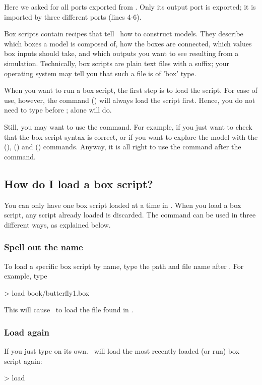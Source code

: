 Here we asked for all ports exported from . Only its  output port is exported; it is imported by three different  ports (lines 4-6).


Box scripts contain recipes that tell \US\ how to construct models. They describe which boxes a model is composed of, how the boxes are connected, which values box inputs should take, and which outputs you want to see resulting from a simulation. Technically, box scripts are plain text files with a  suffix; your operating system may tell you that such a file is of 'box' type. 

When you want to run a box script, the first step is to load the script. For ease of use, however, the  command () will always load the script first. Hence, you do not need to type  before ;  alone will do.

Still, you may want to use the  command. For example, if you just want to check that the box script syntax is correct, or if you want to explore the model with the  (),  () and  () commands. Anyway, it is all right to use the  command after the  command.

\subsection{How do I load a box script?}
You can only have one box script loaded at a time in \US. When you load a box script, any script already loaded is discarded. The  command can be used in three different ways, as explained below.

\subsubsection{Spell out the name}

To load a specific box script by name, type the path and file name after . For example, type
\begin{usdialog}
> load book/butterfly1.box
\end{usdialog}

This will cause \US\ to load the file found in .

\subsubsection{Load again}
If you just type  on its own. \US\ will load the most recently loaded (or run) box script again:
\begin{usdialog}
> load 
\end{usdialog}

